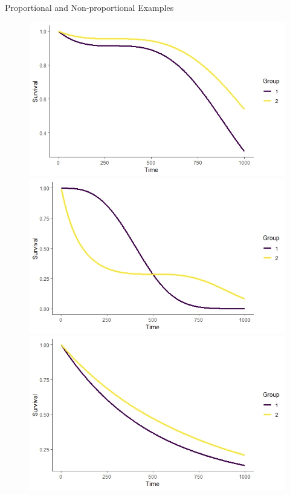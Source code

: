 \documentclass[10pt,t]{beamer}
\begin{document}
\begin{frame}{Proportional and Non-proportional Examples}
	\begin{figure}
		\centering
		\includegraphics[scale = 0.15]{figs/prop_survival_1}
		\includegraphics[scale = 0.15]{figs/nonprop_survival_2}
		\includegraphics[scale = 0.15]{figs/nonprop_survival_1}

\end{figure}
\end{frame}
\end{document}
